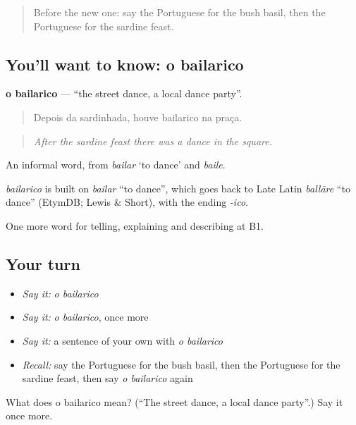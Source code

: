 \label{lesson:PT-C319-bailarico}



\begin{quote}
Before the new one: say the Portuguese for the bush basil, then the Portuguese for the sardine feast.
\end{quote}

\subsection*{You'll want to know: o bailarico}
\textbf{o bailarico} — \textquotedblleft{}the street dance, a local dance party\textquotedblright{}.

\begin{quote}
Depois da sardinhada, houve bailarico na praça.
\end{quote}

\begin{quote}
\emph{After the sardine feast there was a dance in the square.}
\end{quote}

An informal word, from \emph{bailar} ‘to dance’ and \emph{baile}.

\begin{cousinweb}
\emph{bailarico} is built on \emph{bailar} \textquotedblleft{}to dance\textquotedblright{}, which goes back to Late Latin \emph{ballāre} \textquotedblleft{}to dance\textquotedblright{} (EtymDB; Lewis \& Short), with the ending \emph{-ico}.
\end{cousinweb}

\begin{grammarlens}[title={What you've built}]
One more word for telling, explaining and describing at B1.
\end{grammarlens}

\subsection*{Your turn}
\begin{itemize}
\raggedright
  \item \emph{Say it:} \emph{o bailarico}
  \item \emph{Say it:} \emph{o bailarico}, once more
  \item \emph{Say it:} a sentence of your own with \emph{o bailarico}
  \item \emph{Recall:} say the Portuguese for the bush basil, then the Portuguese for the sardine feast, then say \emph{o bailarico} again
\end{itemize}

\begin{tcolorbox}[breakable,colback=teal!4,colframe=teal!35!black,title={Before you move on}]
What does o bailarico mean? (\textquotedblleft{}The street dance, a local dance party\textquotedblright{}.) Say it once more.
\end{tcolorbox}
